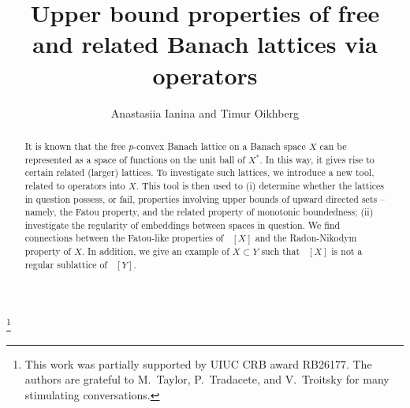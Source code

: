 \documentclass{amsart}
\theoremstyle{plain}
\theoremstyle{definition}
\numberwithin{equation}{section}
\DeclareMathOperator{\FBLp}{FBL^{\mathit{(p)}}}
\newcommand{\Hp}{H_{w^*}^{p}}
\newcommand{\Ip}{\overline{I}_{w^*}^{p}}
\begin{document}
\title[Upper bound properties via operators]{Upper bound properties of free and related Banach lattices via operators}

\author{Anastasiia Ianina and Timur Oikhberg}


\address{Department of Mathematics, University of Illinois at Urbana-Champaign, Urbana, IL}

\thanks{This work was partially supported by UIUC CRB award RB26177. The authors are grateful to M.~Taylor, P.~Tradacete, and V.~Troitsky for many stimulating conversations.}


\begin{abstract}
It is known that the free $p$-convex Banach lattice on a Banach space $X$ can be represented as a space of functions on the unit ball of $X^*$.
In this way, it gives rise to certain related (larger) lattices. To investigate such lattices, we introduce a new tool, related to operators into $X$.
This tool is then used to (i) determine whether the lattices in question possess, or fail, properties involving upper bounds of upward directed sets -- namely, the Fatou property, and the related property of monotonic boundedness; (ii) investigate the regularity of embeddings between spaces in question.
We find connections between the Fatou-like properties of $\FBLp[X]$ and the Radon-Nikodym property of $X$.
In addition, we give an example of $X \subset Y$ such that $\FBLp[X]$ is not a regular sublattice of $\FBLp[Y]$.
\end{abstract}
\end{document}
